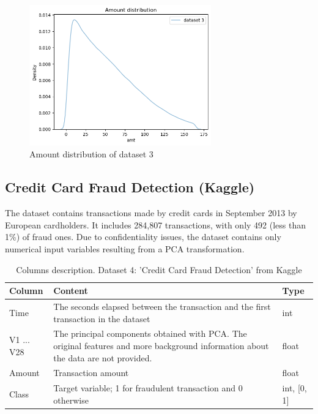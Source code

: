 \documentclass[12pt,a4paper, hidelinks]{article}
\begin{document}
\begin{figure}[h!]
    \centering
    \includegraphics[width=0.7\textwidth]{images/amount3.png}
    \caption{Amount distribution of dataset 3}
    \label{fig:amount3}
\end{figure}

\subsection{Credit Card Fraud Detection (Kaggle)}

The dataset contains transactions made by credit cards in September 2013 by European cardholders. It includes 284,807 transactions, with only 492 (less than 1\%) of fraud ones. Due to confidentiality issues, the dataset contains only numerical input variables resulting from a PCA transformation.

\begin{table}[ht!]
    \centering
    \begin{tabular}{|p{2.5cm}|p{10cm}|p{2cm}|}
    \hline
    \textbf{Column} & \textbf{Content} & \textbf{Type} \\
    \hline
    Time & The seconds elapsed between the transaction and the first transaction in the dataset & int \\
    \hline
    V1 ... V28 & The principal components obtained with PCA. The original features and more background information about the data are not provided. & float \\
    \hline
    Amount & Transaction amount & float \\
    \hline
    Class & Target variable; 1 for fraudulent transaction and 0 otherwise & int, [0, 1] \\
    \hline
    \end{tabular}
    \caption{Columns description. Dataset 4: 'Credit Card Fraud Detection' from Kaggle}
\end{table}
\end{document}
